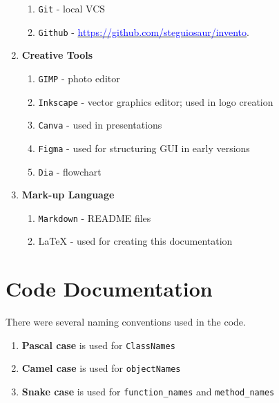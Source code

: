 \documentclass[12pt,a4paper]{article}
\begin{document}
\begin{enumerate}
\begin{enumerate}
                    \item[] \texttt{Git} - local VCS
                    \item[] \texttt{Github} - \href{https://github.com/steguiosaur/invento}{\textcolor{blue}{https://github.com/steguiosaur/invento}}.
                \end{enumerate}
            \item[\faPaintBrush]  \textbf{Creative Tools} 
                \begin{enumerate}
                    \item[] \texttt{GIMP} - photo editor
                    \item[] \texttt{Inkscape} - vector graphics editor; used in logo creation
                    \item[] \texttt{Canva} - used in presentations
                    \item[] \texttt{Figma} - used for structuring GUI in early versions
                    \item[] \texttt{Dia} - flowchart
                \end{enumerate}
            \item[\faFileText]  \textbf{Mark-up Language} 
                \begin{enumerate}
                    \item[] \texttt{Markdown} - README files
                    \item[] \LaTeX{} - used for creating this documentation
                \end{enumerate}
        \end{enumerate}


    \newpage
    \part{ Code Documentation }

    There were several naming conventions used in the code.

    \begin{enumerate}
        \item[] \textbf{Pascal case} is used for \texttt{ClassNames}
        \item[] \textbf{Camel case} is used for \texttt{objectNames}
        \item[] \textbf{Snake case} is used for \texttt{function\_names} and \texttt{method\_names}
    \end{enumerate}
\end{document}
